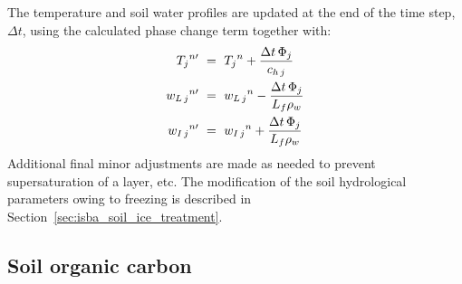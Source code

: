The temperature and soil water profiles are updated
at the end of the time step, $\Delta t$, using the
calculated phase change term
together with:
%
\begin{align}
\label{tdifsni}
{T_j}^{n\prime}\,\,&=\,\, 
{T_j}^{n} + {\Delta t\,\Phi_j\over c_{h\,j}}
\\
%
\label{conti}
{w_{L\,j}}^{n\prime} \,\,&=\,\, 
{w_{L\,j}}^{n} - {\Delta t\,\Phi_j\over L_f \rho_w}
\\
%
\label{icei}
{w_{I\,j}}^{n\prime} \,\,&=\,\, 
{w_{I\,j}}^{n} + 
{\Delta t\,\Phi_j\over L_f \rho_w}
%
\end{align}
%
Additional final minor adjustments are made as needed
to prevent supersaturation of a layer, etc.
%
The modification of the soil hydrological parameters owing to freezing is described
in Section~\ref{sec:isba_soil_ice_treatment}.


\subsection{Soil organic carbon}
\label{sec:soil_origanic_carbon}

